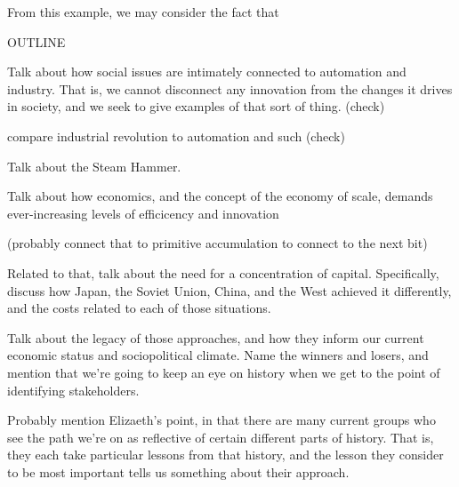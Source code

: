 \cite{marx1867strife}

From this example, we may consider the fact that 

 

{\large OUTLINE}


Talk about how social issues are intimately connected to automation 
and industry.  That is, we cannot disconnect any innovation from the 
changes it drives in society, and we seek to give examples of that sort 
of thing. (check)

compare industrial revolution to automation and such (check)

Talk about the Steam Hammer.

Talk about how economics, and the concept of the economy of scale, 
demands ever-increasing levels of efficicency and innovation

(probably connect that to primitive accumulation to connect to the next bit)

Related to that, talk about the need for a concentration of capital.  
Specifically, discuss how Japan, the Soviet Union, China, and the 
West achieved it differently, and the costs related to each of those 
situations.

Talk about the legacy of those approaches, and how they inform our 
current economic status and sociopolitical climate.  Name the winners 
and losers, and mention that we're going to keep an eye on history when 
we get to the point of identifying stakeholders.  

Probably mention 
Elizaeth's point, in that there are many current groups who see the 
path we're on as reflective of certain different parts of history.  
That is, they each take particular lessons from that history, and 
the lesson they consider to be most important tells us something 
about their approach.





